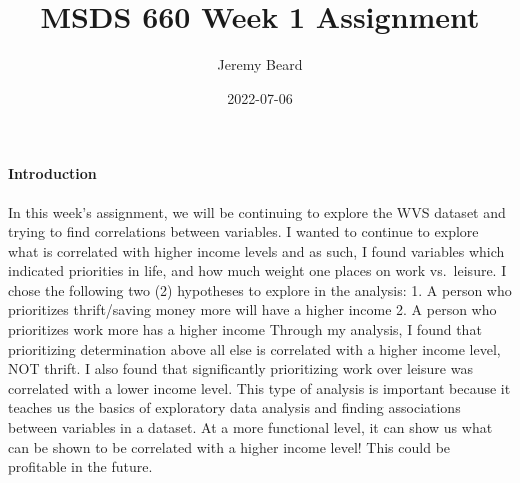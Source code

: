 \documentclass[
]{article}
\title{MSDS 660 Week 1 Assignment}
\author{Jeremy Beard}
\date{2022-07-06}
\begin{document}
\maketitle

\hypertarget{introduction}{%
\paragraph{Introduction}\label{introduction}}

In this week's assignment, we will be continuing to explore the WVS
dataset and trying to find correlations between variables. I wanted to
continue to explore what is correlated with higher income levels and as
such, I found variables which indicated priorities in life, and how much
weight one places on work vs.~leisure. I chose the following two (2)
hypotheses to explore in the analysis: 1. A person who prioritizes
thrift/saving money more will have a higher income 2. A person who
prioritizes work more has a higher income Through my analysis, I found
that prioritizing determination above all else is correlated with a
higher income level, NOT thrift. I also found that significantly
prioritizing work over leisure was correlated with a lower income level.
This type of analysis is important because it teaches us the basics of
exploratory data analysis and finding associations between variables in
a dataset. At a more functional level, it can show us what can be shown
to be correlated with a higher income level! This could be profitable in
the future.
\end{document}
